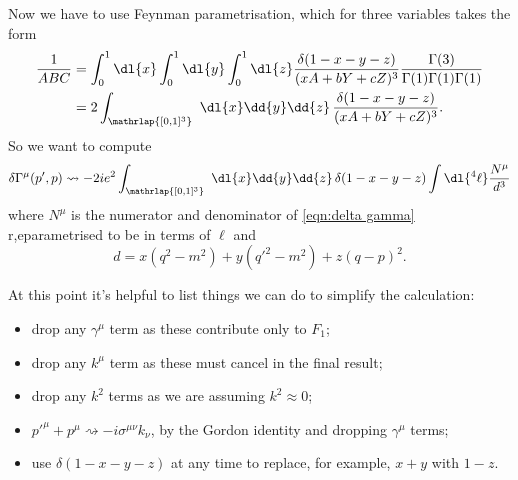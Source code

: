 \documentclass[fleqn]{NotesClass}
\begin{document}
    Now we have to use Feynman parametrisation, which for three variables takes the form
    \begin{align}
        \frac{1}{ABC} &= \int_0^1 \dl{x} \int_0^1 \dl{y} \int_0^1 \dl{z} \frac{\delta(1 - x - y - z)}{(xA + bY + cZ)^3} \frac{\Gamma(3)}{\Gamma(1)\Gamma(1)\Gamma(1)}\\
        &= 2 \int_{\mathrlap{[0, 1]^3}} \  \dl{x} \dd{y} \dd{z} \, \frac{\delta(1 - x - y - z)}{(xA + bY + cZ)^3}.
    \end{align}
    So we want to compute
    \begin{equation}
        \delta\Gamma^\mu(p', p) \rightsquigarrow -2ie^2 \int_{\mathrlap{[0, 1]^3}} \  \dl{x} \dd{y} \dd{z} \, \delta(1 - x - y - z) \int \dl{^4\ell} \frac{N^\mu}{d^3}
    \end{equation}
    where \(N^\mu\) is the numerator and denominator of \cref{eqn:delta gamma} r,eparametrised to be in terms of \(\ell\) and
    \begin{equation}
        d = x(q^2 - m^2) + y(q'^2 - m^2) + z(q - p)^2.
    \end{equation}

    At this point it's helpful to list things we can do to simplify the calculation:
    \begin{itemize}
        \item drop any \(\gamma^\mu\) term as these contribute only to \(F_1\);
        \item drop any \(k^\mu\) term as these must cancel in the final result;
        \item drop any \(k^2\) terms as we are assuming \(k^2 \approx 0\);
        \item \(p'^\mu + p^\mu \rightsquigarrow -i\sigma^{\mu\nu}k_\nu\), by the Gordon identity and dropping \(\gamma^\mu\) terms;
        \item use \(\delta(1 - x - y - z)\) at any time to replace, for example, \(x + y\) with \(1 - z\).
    \end{itemize}
    
\end{document}
